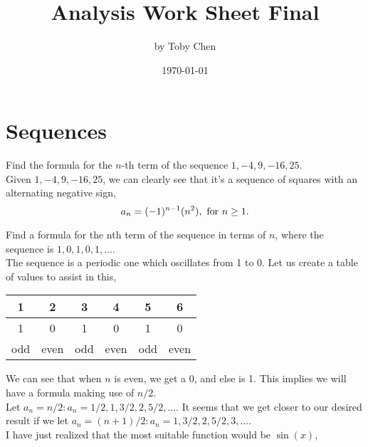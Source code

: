 \documentclass{article}
\title{Analysis Work Sheet Final}
\author{by Toby Chen}
\date{\today}
\begin{document}
    \maketitle

    \tableofcontents

    \section{Sequences}
            Find the formula for the $n$-th term of the sequence $1, -4, 9, -16, 25$.\\
            
            \ans Given $1, -4, 9, -16, 25$, we can clearly see that it's a sequence of squares with an alternating negative sign,\\

            \[a_n = (-1)^{n - 1}(n^2),\text{ for } n\geq 1.\]

            Find a formula for the nth term of the sequence in terms of $n$, where the sequence is $1,0,1,0,1,\dots$.\\

            \ans The sequence is a periodic one which oscillates from 1 to 0. Let us create a table of values to assist in this,

            \begin{center}
                \begin{tabular}{|c|c|c|c|c|c|}
                    \hline
                    1 & 2 & 3 & 4 & 5 & 6 \\
                    \hline
                    1 & 0 & 1 & 0 & 1 & 0 \\
                    \hline
                    odd & even & odd & even & odd & even\\
                    \hline
                \end{tabular}
            \end{center}

            We can see that when $n$ is even, we get a 0, and else is 1. This implies we will have a formula making use of $n/2$.\\

            Let $a_n = n/2 : a_n = 1/2, 1, 3/2, 2, 5/2, \dots$. It seems that we get closer to our desired result if we let $a_n = (n+1)/2 : a_n = 1, 3/2, 2, 5/2, 3, \dots$.\\

            I have just realized that the most suitable function would be $\sin(x)$, 
\end{document}
